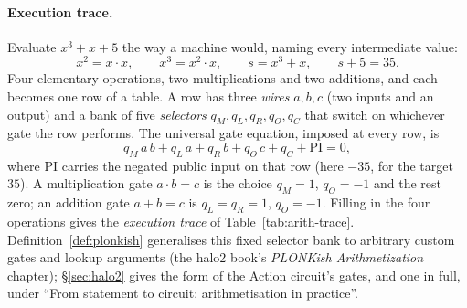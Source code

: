 \documentclass[11pt,a4paper]{article}
\theoremstyle{definition}
\begin{document}
\paragraph{Execution trace.}
Evaluate $x^3 + x + 5$ the way a machine would, naming every intermediate
value:
\[
x^2 = x \cdot x, \qquad x^3 = x^2 \cdot x, \qquad s = x^3 + x, \qquad
s + 5 = 35 .
\]
Four elementary operations, two multiplications and two additions, and each
becomes one row of a table. A row has three \emph{wires} $a, b, c$ (two
inputs and an output) and a bank of five \emph{selectors}
$q_M, q_L, q_R, q_O, q_C$ that switch on whichever gate the row performs.
The universal gate equation, imposed at every row, is
\begin{equation}\label{eq:arith-gate}
q_M\,a\,b + q_L\,a + q_R\,b + q_O\,c + q_C + \mathrm{PI} = 0,
\end{equation}
where $\mathrm{PI}$ carries the negated public input on that row (here
$-35$, for the target $35$). A multiplication gate $a \cdot b = c$ is the
choice $q_M = 1$, $q_O = -1$ and the rest zero; an addition gate
$a + b = c$ is $q_L = q_R = 1$, $q_O = -1$. Filling in the four
operations gives the
\emph{execution trace} of Table~\ref{tab:arith-trace}.
Definition~\ref{def:plonkish} generalises this fixed selector bank to
arbitrary custom gates and lookup arguments (the halo2 book's
\emph{PLONKish Arithmetization} chapter); \S\ref{sec:halo2} gives the
form of the Action circuit's gates, and one in full, under ``From
statement to circuit: arithmetisation in practice''.
\end{document}
